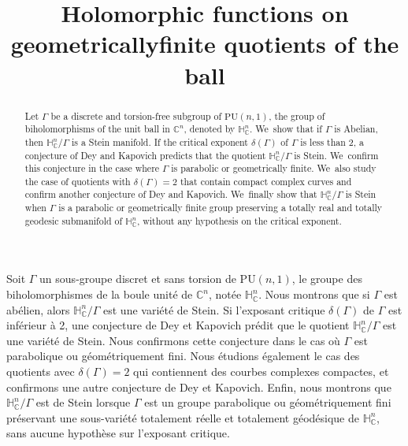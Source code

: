 \documentclass[JEP,XML,SOM,Unicode,NoEqCountersInSection,published]{cedram}
\theoremstyle{definition}
\newcommand{\C}{\mathbb{C}}
\newcommand{\HNC}{\mathbb{H}^{n}_{\C}}
\newcommand{\PU}{\mathrm{PU}}
\def\C{\mathbb{C}}
\newcommand{\HNC}{\mathbb{H}^{n}_{\C}}
\newcommand{\PU}{\mathrm{PU}}
\begin{document}
\frontmatter
\title{Holomorphic functions on geometrically\nobreakspace finite quotients of the ball}

\author[\initial{W.} \lastname{Sarem}]{ }
\address{Univ. Grenoble Alpes, CNRS, IF,\\
38000 Grenoble, France}

\begin{abstract}
Let $\Gamma$ be a discrete and torsion-free subgroup of $\PU(n,1)$, the group of biholomorphisms of the unit ball in $\C^{n}$, denoted by $\HNC$. We~show that if $\Gamma$ is Abelian, then $\HNC/\Gamma$ is a Stein manifold. If the critical exponent $\delta(\Gamma)$ of $\Gamma$ is less than 2, a conjecture of Dey and Kapovich predicts that the quotient $\HNC/\Gamma$ is Stein. We~confirm this conjecture in the case where $\Gamma$ is parabolic or geometrically finite. We~also study the case of quotients with $\delta(\Gamma)=2$ that contain compact complex curves and confirm another conjecture of Dey and Kapovich. We~finally show that $\HNC/\Gamma$ is Stein when $\Gamma$ is a parabolic or geometrically finite group preserving a totally real and totally geodesic submanifold of $\HNC$, without any hypothesis on the critical exponent.
\end{abstract}





\begin{altabstract}
Soit $\Gamma$ un sous-groupe discret et sans torsion de $\mathrm{PU}(n,1)$, le groupe des biholomorphismes de la boule unité de $\mathbb{C}^{n}$, notée $\mathbb{H}^{n}_{\mathbb{C}}$. Nous montrons que si $\Gamma$ est abélien, alors $\mathbb{H}^{n}_{\mathbb{C}}/\Gamma$ est une variété de Stein. Si l’exposant critique $\delta(\Gamma)$ de $\Gamma$ est inférieur à 2, une conjecture de Dey et Kapovich prédit que le quotient $\mathbb{H}^{n}_{\mathbb{C}}/\Gamma$ est une variété de Stein. Nous confirmons cette conjecture dans le cas où $\Gamma$ est parabolique ou géométriquement fini. Nous étudions également le cas des quotients avec $\delta(\Gamma)=2$ qui contiennent des courbes complexes compactes, et confirmons une autre conjecture de Dey et Kapovich. Enfin, nous montrons que $\mathbb{H}^{n}_{\mathbb{C}}/\Gamma$ est de Stein lorsque $\Gamma$ est un groupe parabolique ou géométriquement fini préservant une sous-variété totalement réelle et totalement géodésique de $\mathbb{H}^{n}_{\mathbb{C}}$, sans aucune hypothèse sur l’exposant critique.
\end{altabstract}
\end{document}
